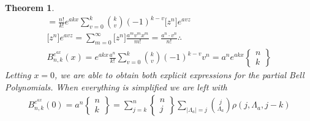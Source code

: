 \documentclass[11pt]{article}
\theoremstyle{plain}
\newtheorem{theorem}{Theorem}[section]   %
\theoremstyle{definition}
\begin{document}
\begin{theorem}
\begin{align*}
= \frac{n!}{k!}e^{akx}\sum_{v=0}^k \binom{k}{v} (-1)^{k-v}\big[z^n\big]e^{avz}\\
\big[z^n\big]e^{avz} =  \sum_{m=0}^\infty \big[z^n\big] \frac{a^m v^m x^m}{m!} = \frac{a^n \cdot v^n}{n!} \therefore\\
B_{n,k}^{e^{ax}}(x) = e^{akx} \frac{a^n}{k!} \sum_{v=0}^k \binom{k}{v} (-1)^{k-v}v^n = a^n e^{akx} \begin{Bmatrix} n \\ k \end{Bmatrix}
\end{align*}
Letting $x=0$, we are able to obtain both explicit expressions for the partial
Bell Polynomials. When everything is simplified we are left with
\begin{align*}
B_{n,k}^{e^{ax}}(0) = a^n \begin{Bmatrix} n \\ k \end{Bmatrix} = \sum_{j=k}^n \begin{Bmatrix} n \\ j \end{Bmatrix} \sum_{|\Lambda_a|=j} \binom{j}{\Lambda_a} \rho(j,\Lambda_a,j-k)
\end{align*}
\end{theorem}
\end{document}
